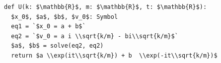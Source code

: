 \documentclass[border=10pt]{standalone}
\begin{document}
\begin{lstlisting}
def U(k: $\mathbb{R}$, m: $\mathbb{R}$, t: $\mathbb{R}$):
  $x_0$, $a$, $b$, $v_0$: Symbol
  eq1 = `$x_0 = a + b$`
  eq2 = `$v_0 = a i \\sqrt{k/m} - bi\\sqrt{k/m}$`
  $a$, $b$ = solve(eq2, eq2)
  return $a \\exp(it\\sqrt{k/m}) + b  \\exp(-it\\sqrt{k/m})$
\end{lstlisting}
\end{document}
